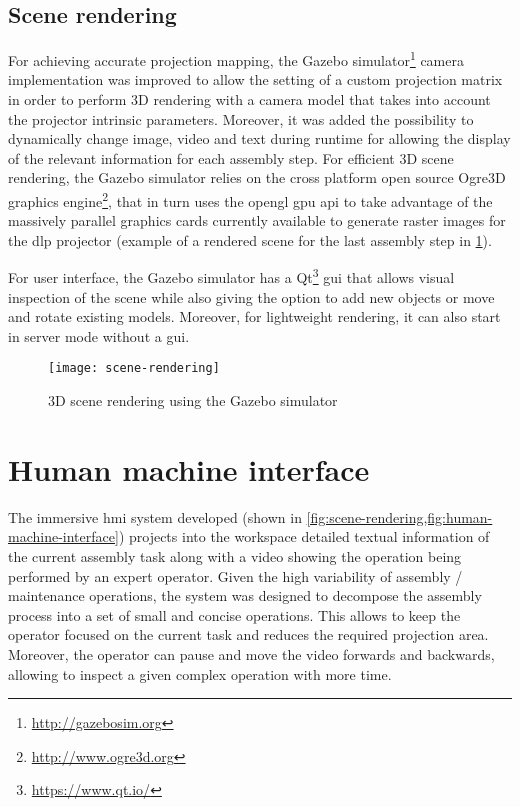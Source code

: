 \subsection{Scene rendering}

For achieving accurate projection mapping, the Gazebo simulator\footnote{\url{http://gazebosim.org}} camera implementation was improved to allow the setting of a custom projection matrix in order to perform 3D rendering with a camera model that takes into account the projector intrinsic parameters. Moreover, it was added the possibility to dynamically change image, video and text during runtime for allowing the display of the relevant information for each assembly step.
For efficient 3D scene rendering, the Gazebo simulator relies on the cross platform open source Ogre3D graphics engine\footnote{\url{http://www.ogre3d.org}}, that in turn uses the \gls{opengl} \gls{gpu} \gls{api} to take advantage of the massively parallel graphics cards currently available to generate raster images for the \gls{dlp} projector (example of a rendered scene for the last assembly step in \cref{fig:scene-rendering}).

For user interface, the Gazebo simulator has a Qt\footnote{\url{https://www.qt.io/}} \gls{gui} that allows visual inspection of the scene while also giving the option to add new objects or move and rotate existing models. Moreover, for lightweight rendering, it can also start in server mode without a \gls{gui}.

\begin{figure}[ht]
	\centering
	\texttt{[image: scene-rendering]}
	\caption{3D scene rendering using the Gazebo simulator}
	\label{fig:scene-rendering}
\end{figure}



\section{Human machine interface}\label{sec:human-machine-interaction}

The immersive \gls{hmi} system developed (shown in \cref{fig:scene-rendering,fig:human-machine-interface}) projects into the workspace detailed textual information of the current assembly task along with a video showing the operation being performed by an expert operator. Given the high variability of assembly / maintenance operations, the system was designed to decompose the assembly process into a set of small and concise operations. This allows to keep the operator focused on the current task and reduces the required projection area. Moreover, the operator can pause and move the video forwards and backwards, allowing to inspect a given complex operation with more time.

